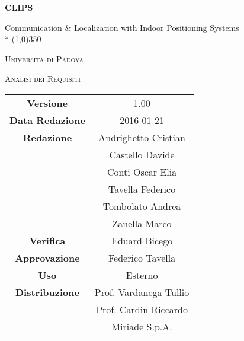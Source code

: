 \documentclass[a4paper,12pt]{article}
\author{Oscar Elia Conti, Marco Zanella}
\date{9/12/2015}
\begin{document}
	\begin{titlepage}
		\centering
		{\huge\bfseries CLIPS\par}
	Communication \& Localization with Indoor Positioning Systems \\*
	\line(1,0){350} \\
	{\scshape\LARGE Università di Padova \par}
	\vspace{1cm}
	{\scshape\Large Analisi dei Requisiti \par}
	\logo
	\newpage
		\begin{tabular}{c|c}
			{\hfill \textbf{Versione}} 			& 1.00			\\
			{\hfill\textbf{Data Redazione}} 		& 2016-01-21  		\\ 
			{\hfill\textbf{Redazione}} 			& Andrighetto Cristian \\
										& Castello Davide \\
										& Conti Oscar Elia \\
										& Tavella Federico \\
										& Tombolato Andrea \\
										& Zanella Marco \\
			{\hfill\textbf{Verifica}} 				& Eduard Bicego \\ 
			{\hfill\textbf{Approvazione}} 		& Federico Tavella \\
			{\hfill\textbf{Uso}} 					& Esterno			\\
			{\hfill\textbf{Distribuzione}} 			& Prof. Vardanega Tullio \\
											& Prof. Cardin Riccardo \\
											& Miriade S.p.A. \\
		\end{tabular}
	\end{titlepage}
	\newpage
		\pagestyle{myfront}
		
	
	\newpage
		\tableofcontents
	\newpage
		\listoftables
	\newpage
		\listoffigures
	\label{LastFrontPage}
	
	\newpage
	\pagestyle{mymain}
		
	\newpage
		
	\newpage
		
	\newpage
		
	\label{LastPage}
\end{document}
